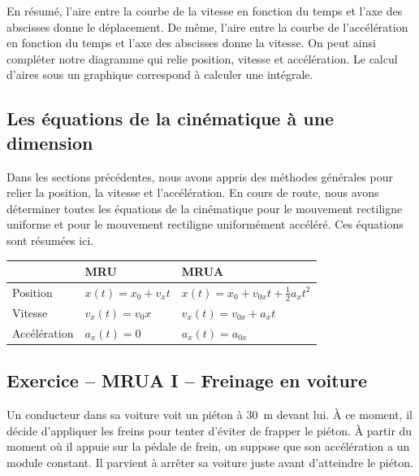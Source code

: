 En résumé, l'aire entre la courbe de la vitesse en fonction du temps et l'axe
des abscisses donne le déplacement.  De même, l'aire entre la courbe de
l'accélération en fonction du temps et l'axe des abscisses donne la vitesse.
On peut ainsi compléter notre diagramme qui relie position, vitesse et
accélération.  Le calcul d'aires sous un graphique correspond à calculer une
intégrale.


\subsection{Les équations de la cinématique à une dimension}

Dans les sections précédentes, nous avons appris des méthodes générales pour
relier la position, la vitesse et l'accélération.  En cours de route, nous
avons déterminer toutes les équations de la cinématique pour le mouvement
rectiligne uniforme et pour le mouvement rectiligne uniformément accéléré.  Ces
équations sont résumées ici.

\begin{tabular}{lll}
  \toprule
               & MRU   & MRUA \\
  \midrule
  Position     & $x(t) = x_0 + v_xt$  &  $x(t) = x_0 + v_{0x}t + \frac{1}{2}a_x t^2$ \\
  Vitesse      & $v_x(t) = v_0x$       &  $v_x(t) = v_{0x} + a_x t$    \\
  Accélération & $a_x(t) = 0$         &  $a_x(t) = a_{0x}$    \\
  \bottomrule
\end{tabular}

\subsection{Exercice -- MRUA I -- Freinage en voiture}

Un conducteur dans sa voiture voit un piéton à \SI{30}{\meter} devant lui.  À
ce moment, il décide d'appliquer les freins pour tenter d'éviter de frapper le
piéton.  À partir du moment où il appuie sur la pédale de frein, on suppose que
son accélération a un module constant.  Il parvient à arrêter sa voiture juste
avant d'atteindre le piéton.

